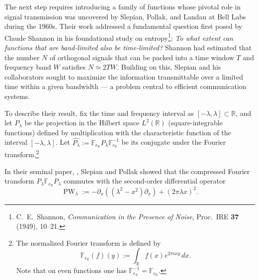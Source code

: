 \documentclass{article}
\def\pw{\operatorname{PW}}
\begin{document}
 The next step requires introducing a family of functions whose pivotal role in signal transmission was uncovered by Slepian, Pollak, and Landau at Bell Labs during the 1960s. Their work addressed a fundamental question first posed by Claude Shannon in his foundational study on entropy\footnote{C.~E.~Shannon, \emph{Communication in the Presence of Noise}, Proc.\ IRE \textbf{37} (1949), 10--21.}: \emph{To what extent can functions that are band-limited also be time-limited?} Shannon had estimated that the number 
 \( N \) of orthogonal signals that can be packed into a time window \( T \) and frequency band \( W \) satisfies \( N \simeq 2TW \).
 Building on this, Slepian and his collaborators sought to maximize the information transmittable over a limited time within a given bandwidth — a problem central to efficient communication systems.


To describe their result, fix the time and frequency interval as \( [-\lambda, \lambda] \subset \mathbb{R} \), and let \( P_\lambda \) be the projection in the Hilbert space \( L^2(\mathbb{R}) \) (square-integrable  functions) defined by multiplication with the characteristic function of the interval \( [-\lambda,\lambda] \). Let \( \widehat{P_\lambda} := \mathbb{F}_{e_{\mathbb{R}}} P_\lambda \mathbb{F}_{e_{\mathbb{R}}}^{-1} \) be its conjugate under the Fourier transform,\footnote{The normalized Fourier transform is defined by
\[
\mathbb{F}_{e_{\mathbb{R}}}(f)(y) := \int_{\mathbb{R}} f(x) e^{2\pi i x y} \, dx.
\]
Note that on even functions one has \( \mathbb{F}_{e_{\mathbb{R}}}^{-1} = \mathbb{F}_{e_{\mathbb{R}}} \).}

In their seminal paper, \cite{Slepian0},
Slepian and Pollak showed that the compressed Fourier transform \( P_\lambda \mathbb{F}_{e_{\mathbb{R}}} P_\lambda \) commutes with the second-order differential operator
\begin{equation}\label{wop}
\pw_\lambda := -\partial_x\left( (\lambda^2 - x^2) \partial_x \right) + (2\pi \lambda x)^2.
\end{equation}
\end{document}

